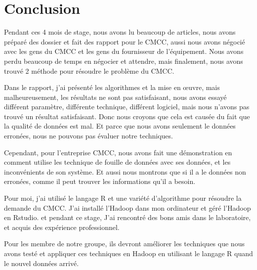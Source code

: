 \section*{Conclusion}

Pendant ces 4 mois de stage, nous avons lu beaucoup de articles, nous avons préparé des dossier et fait des rapport pour le CMCC, aussi nous avons négocié avec les gens du CMCC et les gens du fournisseur de l'équipement. Nous avons perdu beaucoup de temps en négocier et attendre, mais finalement, nous avons trouvé 2 méthode pour résoudre le problème du CMCC.

Dans le rapport, j'ai présenté les algorithmes et la mise en \oe uvre, mais malheureusement, les résultats ne sont pas satisfaisant, nous avons essayé différent paramètre, différente technique, différent logiciel, mais nous n'avons pas trouvé un résultat satisfaisant. Donc nous croyons que cela est causée du fait que la qualité de données est mal. Et parce que nous avons seulement le données erronées, nous ne pouvons pas évaluer notre techniques.

Cependant, pour l'entreprise CMCC, nous avons fait une démonstration en comment utilise les technique de fouille de données avec ses données, et les inconvénients de son système. Et aussi nous montrons que si il a le données non erronées, comme il peut trouver les informations qu'il a besoin.

Pour moi, j'ai utilisé le langage R et une variété d'algorithme pour résoudre la demande du CMCC. J'ai installé l'Hadoop dans mon ordinateur et géré l'Hadoop en Rstudio. et pendant ce stage, J'ai rencontré des bons amis dans le laboratoire, et acquis des expérience professionnel.

Pour les membre de notre groupe, ils devront améliorer les techniques que nous avons testé et appliquer ces techniques en Hadoop en utilisant le langage R quand le nouvel données arrivé.